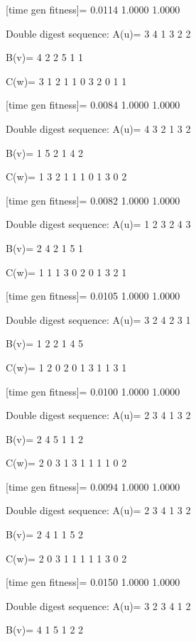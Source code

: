 [time gen fitness]=
    0.0114    1.0000    1.0000

Double digest sequence:
A(u)=
     3     4     1     3     2     2

B(v)=
     4     2     2     5     1     1

C(w)=
     3     1     2     1     1     0     3     2     0     1     1

[time gen fitness]=
    0.0084    1.0000    1.0000

Double digest sequence:
A(u)=
     4     3     2     1     3     2

B(v)=
     1     5     2     1     4     2

C(w)=
     1     3     2     1     1     1     0     1     3     0     2

[time gen fitness]=
    0.0082    1.0000    1.0000

Double digest sequence:
A(u)=
     1     2     3     2     4     3

B(v)=
     2     4     2     1     5     1

C(w)=
     1     1     1     3     0     2     0     1     3     2     1

[time gen fitness]=
    0.0105    1.0000    1.0000

Double digest sequence:
A(u)=
     3     2     4     2     3     1

B(v)=
     1     2     2     1     4     5

C(w)=
     1     2     0     2     0     1     3     1     1     3     1

[time gen fitness]=
    0.0100    1.0000    1.0000

Double digest sequence:
A(u)=
     2     3     4     1     3     2

B(v)=
     2     4     5     1     1     2

C(w)=
     2     0     3     1     3     1     1     1     1     0     2

[time gen fitness]=
    0.0094    1.0000    1.0000

Double digest sequence:
A(u)=
     2     3     4     1     3     2

B(v)=
     2     4     1     1     5     2

C(w)=
     2     0     3     1     1     1     1     1     3     0     2

[time gen fitness]=
    0.0150    1.0000    1.0000

Double digest sequence:
A(u)=
     3     2     3     4     1     2

B(v)=
     4     1     5     1     2     2

